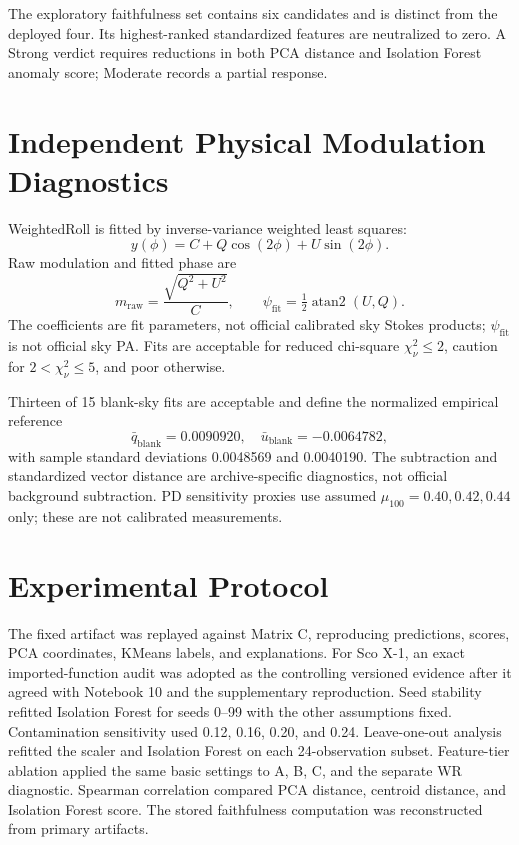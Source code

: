 \documentclass[conference]{IEEEtran}
\begin{document}
The exploratory faithfulness set contains six candidates and is distinct from the deployed four. Its highest-ranked standardized features are neutralized to zero. A Strong verdict requires reductions in both PCA distance and Isolation Forest anomaly score; Moderate records a partial response.

\section{Independent Physical Modulation Diagnostics}

WeightedRoll is fitted by inverse-variance weighted least squares:
\begin{equation}
y(\phi)=C+Q\cos(2\phi)+U\sin(2\phi).
\end{equation}
Raw modulation and fitted phase are
\begin{equation}
m_{\mathrm{raw}}=\frac{\sqrt{Q^2+U^2}}{C},\qquad
\psi_{\mathrm{fit}}=\tfrac12\operatorname{atan2}(U,Q).
\end{equation}
The coefficients are fit parameters, not official calibrated sky Stokes products; \(\psi_{\mathrm{fit}}\) is not official sky PA. Fits are acceptable for reduced chi-square \(\chi_\nu^2\le2\), caution for \(2<\chi_\nu^2\le5\), and poor otherwise.

Thirteen of 15 blank-sky fits are acceptable and define the normalized empirical reference
\begin{equation}
\bar q_{\mathrm{blank}}=0.0090920,\quad
\bar u_{\mathrm{blank}}=-0.0064782,
\end{equation}
with sample standard deviations 0.0048569 and 0.0040190. The subtraction and standardized vector distance are archive-specific diagnostics, not official background subtraction. PD sensitivity proxies use assumed \(\mu_{100}=0.40,0.42,0.44\) only; these are not calibrated measurements.

\section{Experimental Protocol}

The fixed artifact was replayed against Matrix C, reproducing predictions, scores, PCA coordinates, KMeans labels, and explanations. For Sco X-1, an exact imported-function audit was adopted as the controlling versioned evidence after it agreed with Notebook 10 and the supplementary reproduction. Seed stability refitted Isolation Forest for seeds 0--99 with the other assumptions fixed. Contamination sensitivity used 0.12, 0.16, 0.20, and 0.24. Leave-one-out analysis refitted the scaler and Isolation Forest on each 24-observation subset. Feature-tier ablation applied the same basic settings to A, B, C, and the separate WR diagnostic. Spearman correlation compared PCA distance, centroid distance, and Isolation Forest score. The stored faithfulness computation was reconstructed from primary artifacts.
\end{document}
